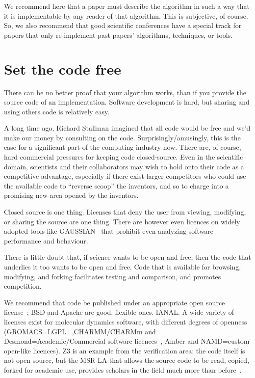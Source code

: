 \documentclass[conference]{IEEEtran}
\begin{document}
We recommend here that a paper must describe the algorithm in such a
way that it is implementable by any reader of that algorithm. This is
subjective, of course. So, we also recommend that good scientific
conferences have a special track for papers that only re-implement
past papers' algorithms, techniques, or tools.


\section{Set the code free} 

There can be no better proof that your algorithm works, than if you
provide the source code of an implementation. Software development is
hard, but sharing and using others code is relatively easy.

A long time ago, Richard Stallman imagined that all code would be free
and we'd make our money by consulting on the code.
Surprisingly/amusingly, this is the case for a significant part of the
computing industry now. There are, of course, hard commercial
pressures for keeping code closed-source. Even in the scientific
domain, scientists and their collaborators may wish to hold onto their
code as a competitive advantage, especially if there exist larger
competitors who could use the available code to ``reverse scoop'' the
inventors, and so to charge into a promising new area opened by the
inventors.

Closed source is one thing. Licenses that deny the user from viewing,
modifying, or sharing the source are one thing. There are however even
licences on widely adopted tools like GAUSSIAN~\cite{Giles2004} that
prohibit even analyzing software performance and behaviour.
 
There is little doubt that, if science wants to be open and free,
then the code that underlies it too wants to be open and free. Code
that is available for browsing, modifying, and forking facilitates
testing and comparison, and promotes competition.

We recommend that code be published under an appropriate open source
license~\cite{osl}; BSD and Apache are good, flexible ones.%
IANAL.  A wide variety of licenses exist for molecular dynamics
software, with different degrees of openness
(GROMACS=LGPL~\cite{Hess2008} ,CHARMM/CHARMm and
Desmond=Academic/Commercial software
licences~\cite{Brooks2009,Bowers2006}, Amber and NAMD=custom open-like
licences). Z3 is an example from the verification area: the code
itself is not open source, but the MSR-LA that allows the source code
to be read, copied, forked for academic use, provides scholars in the
field much more than before~\cite{deMoura2012Z3open}.
\end{document}
